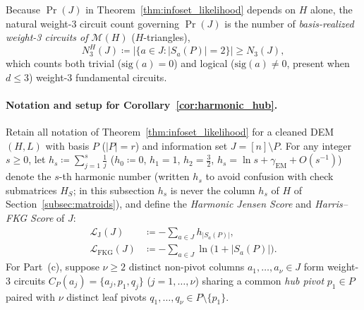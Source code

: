 \documentclass[12pt]{article}
\theoremstyle{definition}
\newcommand{\LH}{\mathcal{L}_{\mathrm{J}}}
\newcommand{\LFKG}{\mathcal{L}_{\mathrm{FKG}}}
\begin{document}
Because $\Pr(J)$ in Theorem~\ref{thm:infoset_likelihood} depends on $H$ alone, the natural weight-3 circuit count
governing $\Pr(J)$ is the number of \emph{basis-realized weight-3 circuits of $\mathcal{M}(H)$} ($H$-triangles),
\begin{equation}\label{eq:N3H_def}
  N_3^H(J) \coloneqq \bigl|\bigl\{a \in J : |S_a(P)| = 2\bigr\}\bigr| \ge N_3(J),
\end{equation}
which counts both trivial ($\mathrm{sig}(a) = 0$) and logical ($\mathrm{sig}(a) \neq 0$, present when $d \le 3$)
weight-3 fundamental circuits.

\paragraph{Notation and setup for Corollary~\ref{cor:harmonic_hub}.}
Retain all notation of Theorem~\ref{thm:infoset_likelihood} for a cleaned DEM $(H, L)$ with basis $P$ ($|P| = r$)
and information set $J = [n] \setminus P$. For any integer $s \ge 0$, let $h_s \coloneqq \sum_{j=1}^s \frac{1}{j}$
($h_0 \coloneqq 0$, $h_1 = 1$, $h_2 = \frac{3}{2}$, $h_s = \ln s + \gamma_{\mathrm{EM}} + O(s^{-1})$) denote the
$s$-th harmonic number (written $h_s$ to avoid confusion with check submatrices $H_S$; in this subsection $h_s$ is
never the column $h_s$ of $H$ of Section~\ref{subsec:matroids}), and define the
\emph{Harmonic Jensen Score} and \emph{Harris--FKG Score} of $J$:
\begin{align}
  \LH(J) &\coloneqq - \sum_{a \in J} h_{|S_a(P)|}, \label{eq:LH_def} \\
  \LFKG(J) &\coloneqq - \sum_{a \in J} \ln\bigl(1 + |S_a(P)|\bigr). \label{eq:LFKG_def}
\end{align}
For Part~(c), suppose $\nu \ge 2$ distinct non-pivot columns $a_1, \dots, a_\nu \in J$ form weight-3 circuits
$C_P(a_j) = \{a_j, p_1, q_j\}$ ($j = 1, \dots, \nu$) sharing a common \emph{hub pivot} $p_1 \in P$ paired with
$\nu$ distinct leaf pivots $q_1, \dots, q_\nu \in P \setminus \{p_1\}$.
\end{document}
